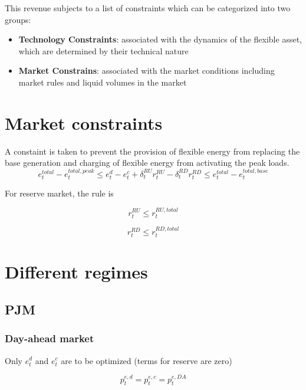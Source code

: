 This revenue subjects to a list of constraints which can be categorized into two groups:
\begin{itemize}
	\item \textbf{Technology Constraints}: associated with the dynamics of the flexible asset, which are determined by their technical nature
	\item \textbf{Market Constrains}: associated with the market conditions including market rules and liquid volumes in the market
\end{itemize}

\section{Market constraints}

A constaint is taken to prevent the provision of flexible energy from replacing the base generation and charging of flexible energy from activating the peak loads. 
\begin{equation}
\label{eq:market-da-high}
e_t^{total} - e_t^{total, peak} \leq e_t^{d} - e_t^{c} + \delta_t^{RU} r_t^{RU} - \delta_t^{RD} r_t^{RD} \leq e_t^{total} - e_t^{total,base}
\end{equation}

For reserve market, the rule is 

\begin{equation}
\label{eq:market-ru-high}
r_t^{RU} \leq r_t^{RU,total}
\end{equation}

\begin{equation}
\label{eq:market-rd-high}
r_t^{RD} \leq r_t^{RD,total}
\end{equation}

\section{Different regimes}
\subsection{PJM}
\subsubsection{Day-ahead market}
Only $e_t^d$ and $e_t^c$ are to be optimized (terms for reserve are zero)

\begin{equation*}
p_t^{e, d} = p_t^{e, c} = p_t^{e,DA}
\end{equation*}

